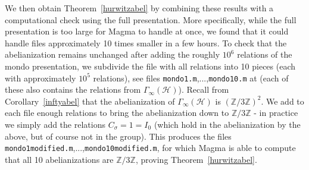 \documentclass{article}[12pt]
\newcommand{\Z}{\mathbb{Z}}
\begin{document}
We then obtain Theorem~\ref{hurwitzabel} by combining these results with a computational check using the full presentation. More specifically, while the full presentation is too large for Magma to handle at once, we found that it could handle files approximately 10 times smaller in a few hours. To check that the abelianization remains unchanged after adding the roughly $10^6$ relations of the mondo presentation, we subdivide the file with all relations into 10 pieces (each with approximately $10^5$ relations), see files {\tt mondo1.m},...,{\tt mondo10.m} at \cite{MCode} (each of these also contains the relations from $\Gamma_\infty(\mathcal{H})$). Recall from Corollary~\ref{inftyabel} that the  abelianization of $\Gamma_\infty(\mathcal{H})$ is $(\Z/3\Z)^2$. We add to each file enough relations to bring the abelianization down to $\Z/3\Z$ - in practice we simply add the relations $C_\sigma=1=I_0$ (which hold in the abelianization by the above, but of course not in the group). This produces the files {\tt mondo1modified.m},...,{\tt mondo10modified.m}, for which Magma is able to compute that all 10 abelianizations are $\Z/3\Z$,  proving Theorem~\ref{hurwitzabel}.
\end{document}
